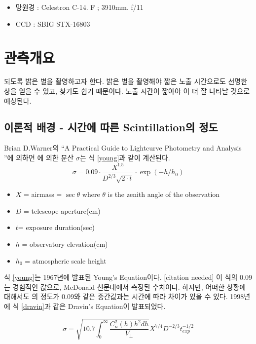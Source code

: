 \documentclass[12pt]{article}
\begin{document}
\begin{itemize}
	\item 망원경 : Celestron C-14. F ; 3910mm. f/11 \cite{telescope}
	\item CCD : SBIG STX-16803 \cite{ccd}
\end{itemize}

\section{관측개요}
되도록 밝은 별을 촬영하고자 한다. 밝은 별을 촬영해야 짧은 노출 시간으로도 선명한 상을 얻을 수 있고, 찾기도 쉽기 때문이다. 노출 시간이 짧아야 \scin 이 더 잘 나타날 것으로 예상된다. 

\subsection{이론적 배경 - 시간에 따른 Scintillation의 정도} \label{exp_1}

Brian D.Warner의 \textquotedblleft A Practical Guide to Lightcurve Photometry and Analysis \textquotedblright 에 의하면 \scin 에 의한 분산 $\sigma$는 식 \ref{young}과 같이 계산된다.
\begin{equation} \label{young}
\sigma = 0.09 \cdot \frac{X^{1.5}}{D^{2/3}\sqrt{2\cdot t}} \cdot \exp{(-h/h_0)}
\end{equation}
\begin{itemize}
	\item $X$ = airmass = $\sec{\theta}$ where $\theta$ is the zenith angle of the observation
	\item $D$ = telescope aperture(cm)
	\item $t$= exposure duration(sec)
	\item $h$ = observatory elevation(cm)
	\item $h_0$ = atmospheric scale height
\end{itemize}

식 \ref{young}는 1967년에 발표된 Young's Equation이다. [citation needed] 이 식의 0.09는 경험적인 값으로, McDonald 천문대에서 측정된 수치이다. 하지만, 어떠한 상황에 대해서도 \scin 의 정도가 0.09와 같은 중간값과는 시간에 따라 차이가 있을 수 있다.\cite{Osborn} 1998년에 식 \ref{dravin}과 같은 Dravin's Equation이 발표되었다.\cite{AISS.1}

\begin{equation} \label{dravin}
\sigma = \sqrt{ 10.7\int_{0}^{\infty}{ \frac{C_n^2(h)h^2dh}{V_\perp} } } X^{7/4}D^{-2/3}t_{exp}^{-1/2}
\end{equation}
\end{document}
